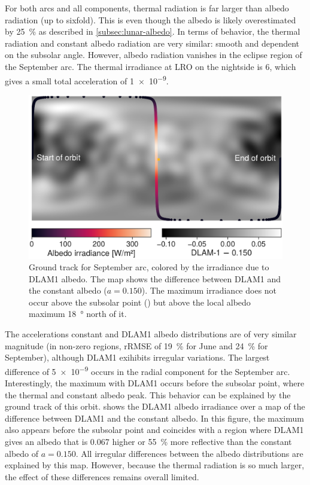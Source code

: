 For both arcs and all components, thermal radiation is far larger than albedo radiation (up to sixfold). This is even though the albedo is likely overestimated by \qty{25}{\percent} as described in \cref{subsec:lunar-albedo}. In terms of behavior, the thermal radiation and constant albedo radiation are very similar: smooth and dependent on the subsolar angle. However, albedo radiation vanishes in the eclipse region of the September arc. The thermal irradiance at \gls{LRO} on the nightside is \qty{6}{\irr}, which gives a small total acceleration of \qty{1e-9}{\acc}.


\begin{figure}[t]
    \centering
    \includegraphics[width=\linewidth]{figures/plots/groundtrack.pdf}
    \caption{Ground track for September arc, colored by the irradiance due to \gls{DLAM1} albedo. The map shows the difference between \gls{DLAM1} and the constant albedo ($a=0.150$). The maximum irradiance does not occur above the subsolar point (\textcolor{mpl-yellow}{}) but above the local albedo maximum \qty{18}{\degree} north of it.}
    \label{fig:groundtrack}
\end{figure}

The accelerations constant and \gls{DLAM1} albedo distributions are of very similar magnitude (in non-zero regions, rRMSE of \qty{19}{\percent} for June and \qty{24}{\percent} for September), although \gls{DLAM1} exihibits irregular variations. The largest difference of \qty{5e-9}{\acc} occurs in the radial component for the September arc. Interestingly, the maximum with \gls{DLAM1} occurs before the subsolar point, where the thermal and constant albedo peak. This behavior can be explained by the ground track of this orbit.  shows the \gls{DLAM1} albedo irradiance over a map of the difference between \gls{DLAM1} and the constant albedo. In this figure, the maximum also appears before the subsolar point and coincides with a region where \gls{DLAM1} gives an albedo that is \num{0.067} higher or \qty{55}{\percent} more reflective than the constant albedo of $a=0.150$. All irregular differences between the albedo distributions are explained by this map. However, because the thermal radiation is so much larger, the effect of these differences remains overall limited.








